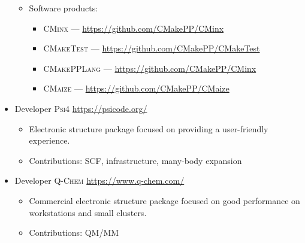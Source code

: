 \documentclass[11pt,a4paper,sans]{moderncv}
\begin{document}
\begin{itemize}
{{\begin{itemize}
		   	    \item{Software products: 
		   	    	\begin{itemize}
		   	    		\item \textsc{CMinx} ---  \url{https://github.com/CMakePP/CMinx}
		   	    		\item \textsc{CMakeTest} --- \url{https://github.com/CMakePP/CMakeTest}
		   	    		\item \textsc{CMakePPLang} --- \url{https://github.com/CMakePP/CMinx}
		   	    		\item \textsc{CMaize} --- \url{https://github.com/CMakePP/CMaize}
		   	    	\end{itemize}
	   	    	}	                                              
 	       \end{itemize}
        }
    }
	\item{
		{Developer}
		{\textsc{Psi4}}
		{\url{https://psicode.org/}}
		{}
		{\begin{itemize}
			\item{Electronic structure package focused on providing a
		  			  user-friendly experience.}
			\item{Contributions: SCF, infrastructure, many-body expansion}
		  \end{itemize}
	  	}
  	}
	\item{
		{Developer}
		{\textsc{Q-Chem}}
		{\url{https://www.q-chem.com/}}
		{}
		{\begin{itemize}
		 	\item{Commercial electronic structure package focused on good
		  			  performance on workstations and small clusters.}
		 	\item{Contributions: QM/MM}
		  \end{itemize}
	  }
	}
\end{itemize}
\end{document}
